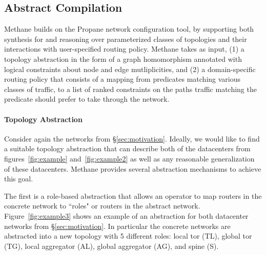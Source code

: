 \documentclass{sig-alternate-10pt}
\newcommand{\IE}{\emph{i.e.}}
\newcommand{\sysname}{{\small \sf Methane}\xspace}
\newcommand{\para}[1]{\paragraph*{\textbf{#1}}}
\newcommand{\KW}[1]{\texttt{\small\bfseries{#1}}}
\newcommand{\Define}{\KW{define}}
\newcommand{\Agg}{\KW{agg}}
\newcommand{\In}{\KW{in}}
\newcommand{\Out}{\KW{out}}
\begin{document}



\subsection{Abstract Compilation}

\sysname builds on the Propane network configuration tool, by supporting both synthesis for and reasoning over parameterized classes of topologies and their interactions with user-specified routing policy.
\sysname takes as input, (1) a topology abstraction in the form of a graph homomorphism annotated with logical constraints about node and edge mutliplicities, and (2) a domain-specific routing policy that consists of a mapping from predicates matching various classes of traffic, to a list of ranked constraints on the paths traffic matching the predicate should prefer to take through the network.

\para{Topology Abstraction}

Consider again the networks from \S\ref{sec:motivation}. Ideally, we would like
to find a suitable topology abstraction that can describe both of the datacenters from figures~\ref{fig:example} and~\ref{fig:example2} as well as any reasonable generalization of these datacenters. \sysname provides several abstraction mechanisms to achieve this goal.

The first is a role-based abstraction that allows an operator to map routers in the concrete network to ``roles" or routers in the abstract network. Figure~\ref{fig:example3} shows an example of an abstraction for both datacenter networks from \S\ref{sec:motivation}. In particular the concrete networks are abstracted into a new topology with 5 different roles: local tor (TL), global tor (TG), local aggregator (AL), global aggregator (AG), and spine (S).
\end{document}
